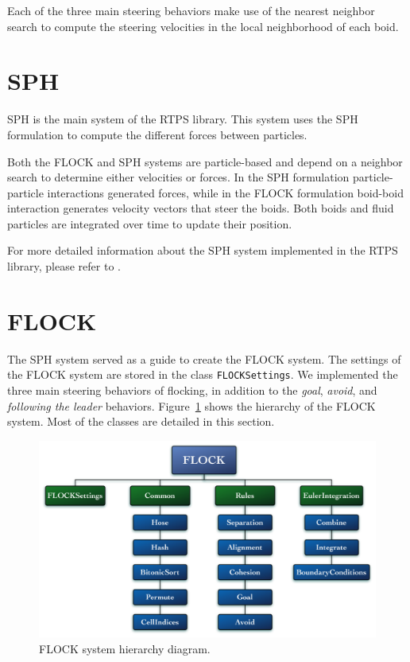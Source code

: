 Each of the three main steering behaviors make use of the nearest neighbor search to compute the steering velocities in the local neighborhood of each boid.

\section{SPH}\label{sphsection}
SPH is the main system of the RTPS library. This system uses the SPH formulation to compute the different forces between particles.

Both the FLOCK and SPH systems are particle-based and depend on a neighbor search to determine either velocities or forces. In the SPH formulation particle-particle interactions generated forces, while in the FLOCK formulation boid-boid interaction generates velocity vectors that steer the boids. Both boids and fluid particles are integrated over time to update their position.

For more detailed information about the SPH system implemented in the RTPS library, please refer to \cite{ianThesis}.

\section{FLOCK}\label{flocksection}
The SPH system served as a guide to create the FLOCK system. The settings of the FLOCK system are stored in the class \texttt{FLOCKSettings}. We implemented the three main steering behaviors of flocking, in addition to the \textit{goal}, \textit{avoid}, and \textit{following the leader} behaviors. Figure~\ref{flockdiagram} shows the hierarchy of the FLOCK system. Most of the classes are detailed in this section. 

\vspace{32pt}
\begin{figure}[htbp]
\begin{center}
\includegraphics[scale=0.42]{figures/FLOCKdiagramMyrna.pdf}
\caption{FLOCK system hierarchy diagram.} 
\label{flockdiagram}
\end{center}
\end{figure}


